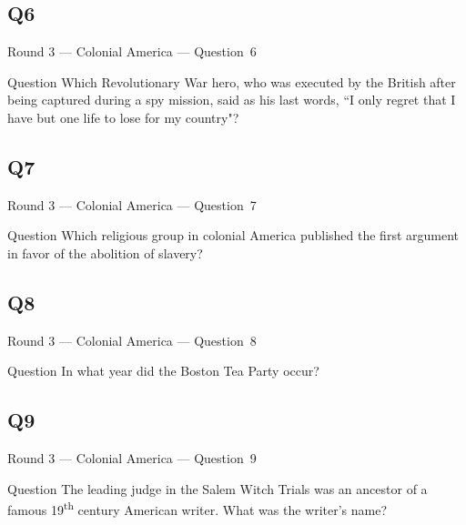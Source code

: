 \documentclass[11pt]{beamer}
\begin{document}
\subsection*{Q6}
\begin{frame}[t]{Round 3 --- Colonial America --- \mbox{Question 6}}
\vspace{-0.5em}
\begin{block}{Question}
Which Revolutionary War hero, who was executed by the British after being captured during a spy mission, said as his last words, ``I only regret that I have but one life to lose for my country"?
\end{block}
\end{frame}
\subsection*{Q7}
\begin{frame}[t]{Round 3 --- Colonial America --- \mbox{Question 7}}
\vspace{-0.5em}
\begin{block}{Question}
Which religious group in colonial America published the first argument in favor of the abolition of slavery?
\end{block}
\end{frame}
\subsection*{Q8}
\begin{frame}[t]{Round 3 --- Colonial America --- \mbox{Question 8}}
\vspace{-0.5em}
\begin{block}{Question}
In what year did the Boston Tea Party occur?
\end{block}
\end{frame}
\subsection*{Q9}
\begin{frame}[t]{Round 3 --- Colonial America --- \mbox{Question 9}}
\vspace{-0.5em}
\begin{block}{Question}
The leading judge in the Salem Witch Trials was an ancestor of a famous 19\textsuperscript{th} century American writer. What was the writer's name?
\end{block}
\end{frame}
\end{document}
